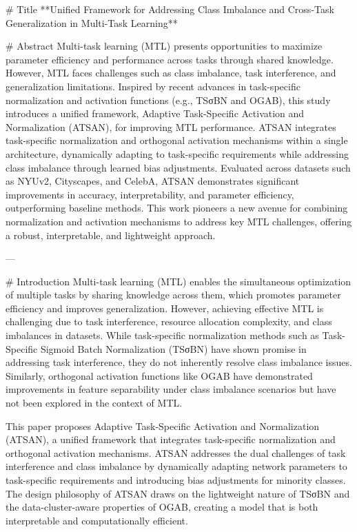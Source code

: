 # Title  
**Unified Framework for Addressing Class Imbalance and Cross-Task Generalization in Multi-Task Learning**  

# Abstract  
Multi-task learning (MTL) presents opportunities to maximize parameter efficiency and performance across tasks through shared knowledge. However, MTL faces challenges such as class imbalance, task interference, and generalization limitations. Inspired by recent advances in task-specific normalization and activation functions (e.g., TSσBN and OGAB), this study introduces a unified framework, Adaptive Task-Specific Activation and Normalization (ATSAN), for improving MTL performance. ATSAN integrates task-specific normalization and orthogonal activation mechanisms within a single architecture, dynamically adapting to task-specific requirements while addressing class imbalance through learned bias adjustments. Evaluated across datasets such as NYUv2, Cityscapes, and CelebA, ATSAN demonstrates significant improvements in accuracy, interpretability, and parameter efficiency, outperforming baseline methods. This work pioneers a new avenue for combining normalization and activation mechanisms to address key MTL challenges, offering a robust, interpretable, and lightweight approach.

---

# Introduction  
Multi-task learning (MTL) enables the simultaneous optimization of multiple tasks by sharing knowledge across them, which promotes parameter efficiency and improves generalization. However, achieving effective MTL is challenging due to task interference, resource allocation complexity, and class imbalances in datasets. While task-specific normalization methods such as Task-Specific Sigmoid Batch Normalization (TSσBN) have shown promise in addressing task interference, they do not inherently resolve class imbalance issues. Similarly, orthogonal activation functions like OGAB have demonstrated improvements in feature separability under class imbalance scenarios but have not been explored in the context of MTL.  

This paper proposes Adaptive Task-Specific Activation and Normalization (ATSAN), a unified framework that integrates task-specific normalization and orthogonal activation mechanisms. ATSAN addresses the dual challenges of task interference and class imbalance by dynamically adapting network parameters to task-specific requirements and introducing bias adjustments for minority classes. The design philosophy of ATSAN draws on the lightweight nature of TSσBN and the data-cluster-aware properties of OGAB, creating a model that is both interpretable and computationally efficient.

